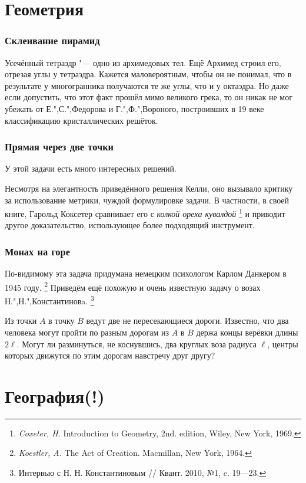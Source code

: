 \documentclass[twoside]{book}
\begin{document}
\section{Геометрия}

\subsubsection*{Склеивание пирамид}
Усечённый тетраэдр "--- одно из архимедовых тел.
Ещё Архимед строил его, отрезая углы у тетраэдра. 
Кажется маловероятным, чтобы он не понимал, что в результате у многогранника получаются те же углы, что и у октаэдра.
Но даже если допустить, что этот факт прошёл мимо великого грека, то он никак не мог убежать от Е.",С.",Федорова и Г.",Ф.",Вороного, построивших в 19 веке классификацию кристаллических решёток.

\subsubsection{Прямая через две точки}
У этой задачи есть много интересных решений.

Несмотря на элегантность приведённого решения Келли, оно вызывало критику за использование метрики, чуждой формулировке задачи.
В частности, в своей книге, Гарольд  Коксетер сравнивает его с \emph{колкой ореха кувалдой}%
\footnote{\emph{Coxeter, H.} Introduction to Geometry, 2nd. edition, Wiley, New York, 1969.}
и приводит другое доказательство, использующее более подходящий инструмент.

\subsubsection{Монах на горе}
По-видимому эта задача придумана немецким психологом Карлом Данкером в 1945 году.%
\footnote{\emph{Koestler, A.} The Act of Creation. Macmillan, New York, 1964.}
Приведём ещё похожую и очень известную задачу о возах Н.",Н.",Константиновa.
\footnote{Интервью с Н. Н. Константиновым /\!/ Квант. 2010, №1, c. 19---23.}

Из точки $A$ в точку $B$ ведут две не пересекающиеся дороги.
Известно, что два человека могут пройти по разным дорогам из $A$ в $B$ держа концы верёвки длины $2\ell$.
Могут ли разминуться, не коснувшись, два круглых воза радиуса $\ell$, центры которых движутся по
этим дорогам навстречу друг другу?

\section{География(!)}
\end{document}

